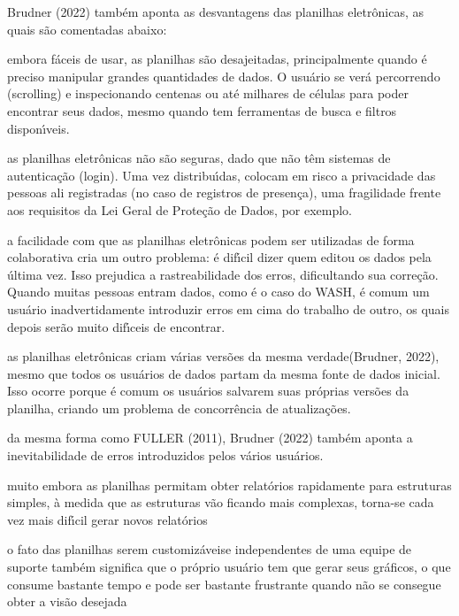 \documentclass[
12pt,		%
openright,	%
twoside,  %
a4paper,			%
chapter=TITLE,		%
english,			%
french,				%
spanish,			%
brazil				%
]{USPSC-classe/USPSC}
\begin{document}
 Brudner (2022) tamb\'em aponta as desvantagens das planilhas eletr\^onicas, as quais s\~ao comentadas abaixo:











\begin{alineas}
\item embora f\'aceis de usar, as planilhas s\~ao desajeitadas, principalmente quando \'e preciso manipular grandes quantidades de dados. O usu\'ario se ver\'a percorrendo (scrolling) e inspecionando centenas ou at\'e milhares de c\'elulas para poder encontrar seus dados, mesmo quando tem ferramentas de busca e filtros dispon\'{\i}veis.
\item as planilhas eletr\^onicas n\~ao s\~ao seguras, dado que n\~ao t\^em sistemas de autentica\c{c}\~ao (login). Uma vez distribu\'{\i}das, colocam em risco a privacidade das pessoas ali registradas (no caso de registros de presen\c{c}a), uma fragilidade frente aos requisitos da Lei Geral de Prote\c{c}\~ao de Dados, por exemplo.
\item a facilidade com que as planilhas eletr\^onicas podem ser utilizadas de forma colaborativa cria um outro problema: \'e dif\'{\i}cil dizer quem editou os dados pela \'ultima vez. Isso prejudica a rastreabilidade dos erros, dificultando sua corre\c{c}\~ao. Quando muitas pessoas entram dados, como \'e o caso do WASH, \'e comum um usu\'ario inadvertidamente introduzir erros em cima do trabalho de outro, os quais depois ser\~ao muito dif\'{\i}ceis de encontrar.
\item as planilhas eletr\^onicas criam v\'arias vers\~oes da mesma \textquotedbl verdade\textquotedbl   (Brudner, 2022), mesmo que todos os usu\'arios de dados partam da mesma fonte de dados inicial. Isso ocorre porque \'e comum os usu\'arios salvarem suas pr\'oprias vers\~oes da planilha, criando um problema de concorr\^encia de atualiza\c{c}\~oes.
\item da mesma forma como  FULLER (2011),  Brudner (2022) tamb\'em aponta a inevitabilidade de erros introduzidos pelos v\'arios usu\'arios.
\item muito embora as planilhas permitam obter relat\'orios rapidamente para estruturas simples, \`a medida que as estruturas v\~ao ficando mais complexas, torna-se cada vez mais dif\'{\i}cil gerar novos relat\'orios
\item o fato das planilhas serem \textquotedbl customiz\'aveis\textquotedbl  e independentes de uma equipe de suporte tamb\'em significa que o pr\'oprio usu\'ario tem que gerar seus gr\'aficos, o que consume bastante tempo e pode ser bastante frustrante quando n\~ao se consegue obter a vis\~ao desejada

\end{alineas}
\end{document}
